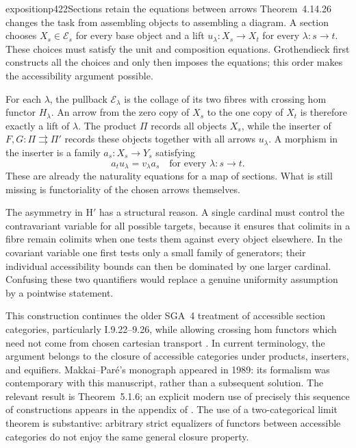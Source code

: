 \begin{dcomment}{exposition}{p422}{Sections retain the equations between arrows}
Theorem~4.14.26 changes the task from assembling objects to assembling a diagram. A section chooses $X_s\in\mathcal E_s$ for every base object and a lift $u_\lambda:X_s\to X_t$ for every $\lambda:s\to t$. These choices must satisfy the unit and composition equations. Grothendieck first constructs all the choices and only then imposes the equations; this order makes the accessibility argument possible.

For each $\lambda$, the pullback $\mathcal E_\lambda$ is the collage of its two fibres with crossing hom functor $H_\lambda$. An arrow from the zero copy of $X_s$ to the one copy of $X_t$ is therefore exactly a lift of $\lambda$. The product $\Pi$ records all objects $X_s$, while the inserter of $F,G:\Pi\rightrightarrows\Pi'$ records these objects together with all arrows $u_\lambda$. A morphism in the inserter is a family $a_s:X_s\to Y_s$ satisfying
\[
 a_tu_\lambda=v_\lambda a_s
 \quad\text{for every }\lambda:s\to t.
\]
These are already the naturality equations for a map of sections. What is still missing is functoriality of the chosen arrows themselves.

The asymmetry in H$'$ has a structural reason. A single cardinal must control the contravariant variable for all possible targets, because it ensures that colimits in a fibre remain colimits when one tests them against every object elsewhere. In the covariant variable one first tests only a small family of generators; their individual accessibility bounds can then be dominated by one larger cardinal. Confusing these two quantifiers would replace a genuine uniformity assumption by a pointwise statement.

This construction continues the older SGA~4 treatment of accessible section categories, particularly I.9.22--9.26, while allowing crossing hom functors which need not come from chosen cartesian transport \citep{SGA4I1972}. In current terminology, the argument belongs to the closure of accessible categories under products, inserters, and equifiers. Makkai--Par\'e's monograph appeared in 1989: its formalism was contemporary with this manuscript, rather than a subsequent solution. The relevant result is Theorem~5.1.6; an explicit modern use of precisely this sequence of constructions appears in the appendix of \citet{ChingRiehl2014}. The use of a two-categorical limit theorem is substantive: arbitrary strict equalizers of functors between accessible categories do not enjoy the same general closure property.
\end{dcomment}

